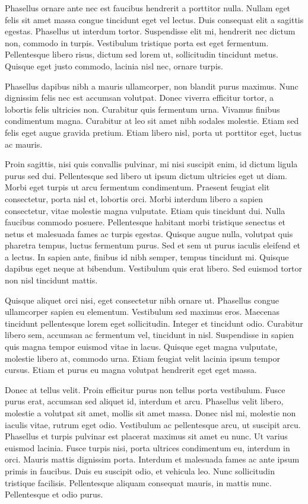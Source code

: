 \documentclass{amsbook}
\begin{document}
Phasellus ornare ante nec est faucibus hendrerit a porttitor nulla. Nullam eget felis sit amet massa congue tincidunt eget vel lectus. Duis consequat elit a sagittis egestas. Phasellus ut interdum tortor. Suspendisse elit mi, hendrerit nec dictum non, commodo in turpis. Vestibulum tristique porta est eget fermentum. Pellentesque libero risus, dictum sed lorem ut, sollicitudin tincidunt metus. Quisque eget justo commodo, lacinia nisl nec, ornare turpis.

Phasellus dapibus nibh a mauris ullamcorper, non blandit purus maximus. Nunc dignissim felis nec est accumsan volutpat. Donec viverra efficitur tortor, a lobortis felis ultricies non. Curabitur quis fermentum urna. Vivamus finibus condimentum magna. Curabitur at leo sit amet nibh sodales molestie. Etiam sed felis eget augue gravida pretium. Etiam libero nisl, porta ut porttitor eget, luctus ac mauris.

Proin sagittis, nisi quis convallis pulvinar, mi nisi suscipit enim, id dictum ligula purus sed dui. Pellentesque sed libero ut ipsum dictum ultricies eget ut diam. Morbi eget turpis ut arcu fermentum condimentum. Praesent feugiat elit consectetur, porta nisl et, lobortis orci. Morbi interdum libero a sapien consectetur, vitae molestie magna vulputate. Etiam quis tincidunt dui. Nulla faucibus commodo posuere. Pellentesque habitant morbi tristique senectus et netus et malesuada fames ac turpis egestas. Quisque augue nulla, volutpat quis pharetra tempus, luctus fermentum purus. Sed et sem ut purus iaculis eleifend et a lectus. In sapien ante, finibus id nibh semper, tempus tincidunt mi. Quisque dapibus eget neque at bibendum. Vestibulum quis erat libero. Sed euismod tortor non nisl tincidunt mattis.

Quisque aliquet orci nisi, eget consectetur nibh ornare ut. Phasellus congue ullamcorper sapien eu elementum. Vestibulum sed maximus eros. Maecenas tincidunt pellentesque lorem eget sollicitudin. Integer et tincidunt odio. Curabitur libero sem, accumsan ac fermentum vel, tincidunt in nisl. Suspendisse in sapien quis magna tempor euismod vitae in lacus. Quisque eget magna vulputate, molestie libero at, commodo urna. Etiam feugiat velit lacinia ipsum tempor cursus. Etiam et purus eu magna volutpat hendrerit eget eget massa.

Donec at tellus velit. Proin efficitur purus non tellus porta vestibulum. Fusce purus erat, accumsan sed aliquet id, interdum et arcu. Phasellus velit libero, molestie a volutpat sit amet, mollis sit amet massa. Donec nisl mi, molestie non iaculis vitae, rutrum eget odio. Vestibulum ac pellentesque arcu, ut suscipit arcu. Phasellus et turpis pulvinar est placerat maximus sit amet eu nunc. Ut varius euismod lacinia. Fusce turpis nisi, porta ultrices condimentum eu, interdum in orci. Mauris mattis dignissim porta. Interdum et malesuada fames ac ante ipsum primis in faucibus. Duis eu suscipit odio, et vehicula leo. Nunc sollicitudin tristique facilisis. Pellentesque aliquam consequat mauris, in mattis nunc. Pellentesque et odio purus.
\end{document}
